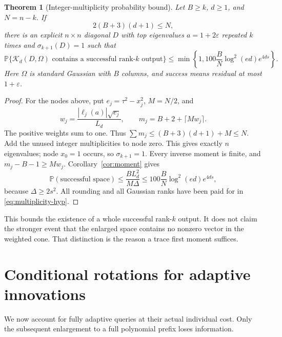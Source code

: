 \documentclass[11pt]{article}
\newtheorem{theorem}{Theorem}[section]
\theoremstyle{definition}
\newcommand{\Prob}{\mathbb P}
\newcommand{\K}{\mathcal K}
\begin{document}
\begin{theorem}[Integer-multiplicity probability bound]\label{thm:primitive}
Let $B\ge k$, $d\ge1$, and $N=n-k$. If
\begin{equation}\label{eq:multiplicity-hyp}
 2(B+3)(d+1)\le N,
\end{equation}
there is an explicit $n\times n$ diagonal $D$ with top eigenvalues $a=1+2\varepsilon$ repeated $k$ times and $\sigma_{k+1}(D)=1$ such that
\begin{equation}\label{eq:primitive-prob}
 \Prob\{\K_d(D,\Omega)\text{ contains a successful rank-}k\text{ output}\}
 \le\min\left\{1,100\frac{B}{N}\log^2(ed)e^{4ds}\right\}.
\end{equation}
Here $\Omega$ is standard Gaussian with $B$ columns, and success means residual at most $1+\varepsilon$.
\end{theorem}
\begin{proof}
For the nodes above, put $e_j=\tau^2-x_j^2$, $M=N/2$, and
\[
 w_j=\frac{|\ell_j(a)|\sqrt{e_j}}{L_d},\qquad
 m_j=B+2+\lceil Mw_j\rceil.
\]
The positive weights sum to one. Thus $\sum m_j\le(B+3)(d+1)+M\le N$. Add the unused integer multiplicities to node zero. This gives exactly $n$ eigenvalues; node $x_0=1$ occurs, so $\sigma_{k+1}=1$. Every inverse moment is finite, and $m_j-B-1\ge Mw_j$. Corollary~\ref{cor:moment} gives
\[
 \Prob(\text{successful space})
 \le\frac{B L_d^2}{M\Delta}
 \le100\frac{B}{N}\log^2(ed)e^{4ds},
\]
because $\Delta\ge2s^2$. All rounding and all Gaussian ranks have been paid for in \eqref{eq:multiplicity-hyp}.
\end{proof}

This bounds the existence of a whole successful rank-$k$ output. It does not claim the stronger event that the enlarged space contains no nonzero vector in the weighted cone. That distinction is the reason a trace first moment suffices.

\section{Conditional rotations for adaptive innovations}\label{sec:rotation}
We now account for fully adaptive queries at their actual individual cost. Only the subsequent enlargement to a full polynomial prefix loses information.
\end{document}
